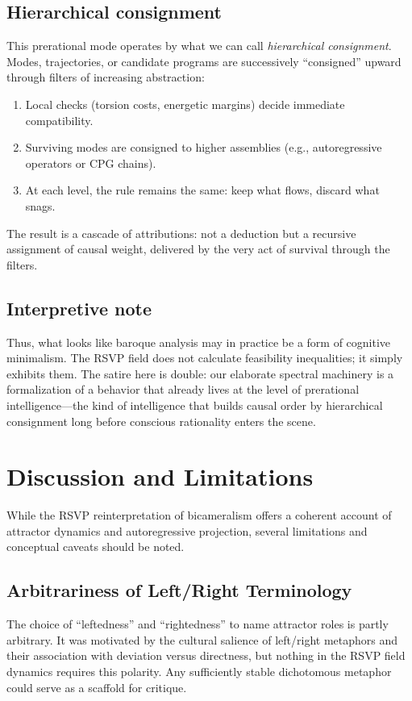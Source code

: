 \documentclass[a4paper,11pt]{article}
\begin{document}
\subsection{Hierarchical consignment}
This prerational mode operates by what we can call \emph{hierarchical
consignment}. Modes, trajectories, or candidate programs are successively
``consigned'' upward through filters of increasing abstraction:
\begin{enumerate}
\item Local checks (torsion costs, energetic margins) decide immediate
compatibility.
\item Surviving modes are consigned to higher assemblies (e.g., autoregressive
operators or CPG chains).
\item At each level, the rule remains the same: keep what flows, discard what
snags.
\end{enumerate}
The result is a cascade of attributions: not a deduction but a recursive
assignment of causal weight, delivered by the very act of survival through the
filters.

\subsection{Interpretive note}
Thus, what looks like baroque analysis may in practice be a form of cognitive
minimalism. The RSVP field does not calculate feasibility inequalities; it
simply exhibits them. The satire here is double: our elaborate spectral
machinery is a formalization of a behavior that already lives at the level of
prerational intelligence---the kind of intelligence that builds causal order
by hierarchical consignment long before conscious rationality enters the
scene.

\section{Discussion and Limitations}
\label{sec:discussion}

While the RSVP reinterpretation of bicameralism offers a coherent account of
attractor dynamics and autoregressive projection, several limitations and
conceptual caveats should be noted.

\subsection{Arbitrariness of Left/Right Terminology}
The choice of ``leftedness'' and ``rightedness'' to name attractor roles is
partly arbitrary. It was motivated by the cultural salience of left/right
metaphors and their association with deviation versus directness, but nothing in
the RSVP field dynamics requires this polarity. Any sufficiently stable
dichotomous metaphor could serve as a scaffold for critique.
\end{document}
